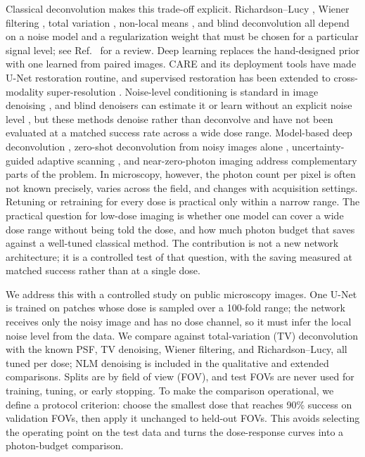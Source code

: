 \documentclass[10pt]{article}
\begin{document}
Classical deconvolution makes this trade-off explicit. Richardson--Lucy
\cite{richardson1972,lucy1974}, Wiener filtering \cite{wiener1949}, total
variation \cite{chambolle2004,rudin1992}, non-local means \cite{buades2005},
and blind deconvolution \cite{kundur1996} all depend on a noise model and a
regularization weight that must be chosen for a particular signal level; see
Ref.~\cite{wallace2001} for a review. Deep learning replaces the hand-designed
prior with one learned from paired images. CARE \cite{weigert2018care} and its
deployment tools \cite{gomez2021deepimagej} have made U-Net restoration
routine, and supervised restoration has been extended to cross-modality
super-resolution \cite{wang2019crossmodality}. Noise-level conditioning is
standard in image denoising \cite{zhang2018ffdnet}, and blind denoisers can
estimate it or learn without an explicit noise level
\cite{guo2019cbdnet,mohan2020biasfree,krull2019}, but these methods denoise
rather than deconvolve and have not been evaluated at a matched success rate
across a wide dose range. Model-based deep deconvolution
\cite{liu2020degeneration}, zero-shot deconvolution from noisy images alone
\cite{qiao2024zsdeconvnet}, uncertainty-guided adaptive scanning
\cite{ye2025uncertainty}, and near-zero-photon imaging
\cite{sheneman2025nearzero} address complementary parts of the problem. In
microscopy, however, the photon count per pixel is often not known precisely,
varies across the field, and changes with acquisition settings. Retuning or
retraining for every dose is practical only within a narrow range. The
practical question for low-dose imaging is whether one model can cover a wide
dose range without being told the dose, and how much photon budget that saves
against a well-tuned classical method. The contribution is not a new network
architecture; it is a controlled test of that question, with the saving
measured at matched success rather than at a single dose.

We address this with a controlled study on public microscopy images. One U-Net
is trained on patches whose dose is sampled over a 100-fold range; the network
receives only the noisy image and has no dose channel, so it must infer the
local noise level from the data. We compare against total-variation (TV)
deconvolution with the known PSF, TV denoising, Wiener filtering, and
Richardson--Lucy, all tuned per dose; NLM denoising is included in the
qualitative and extended comparisons. Splits are by field of view (FOV), and
test FOVs are never used for training, tuning, or early stopping. To make the
comparison operational, we define a protocol criterion: choose the smallest
dose that reaches 90\% success on validation FOVs, then apply it unchanged to
held-out FOVs. This avoids selecting the operating point on the test data and
turns the dose-response curves into a photon-budget comparison.
\end{document}
